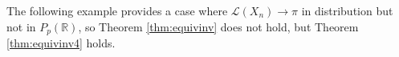 \documentclass[12pt]{article}
\theoremstyle{plain}%
\theoremstyle{definition}
\begin{document}

The following example provides a case where $\mathcal{L}(X_n)\to \pi$ in distribution but not in $P_p(\mathbb{R})$, so Theorem \ref{thm:equivinv} does not hold, but Theorem \ref{thm:equivinv4} holds. 
\end{document}
